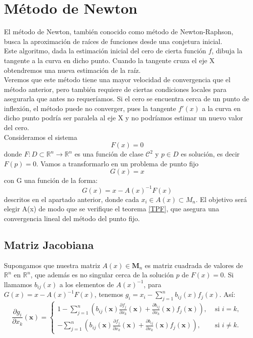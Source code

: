 \section{Método de Newton}

El método de Newton, también conocido como método de Newton-Raphson, busca la aproximación de raíces de funciones desde una conjetura inicial. \\
Este algoritmo, dada la estimación inicial del cero de cierta función $f$, dibuja la tangente a la curva en dicho punto. Cuando la tangente cruza el eje X obtendremos una nueva estimación de la raíz.\\
Veremos que este método tiene una mayor velocidad de convergencia que el método anterior, pero también requiere de ciertas condiciones locales para asegurarla que antes no requeríamos. Si el cero se encuentra cerca de un punto de inflexión, el método puede no converger, pues la tangente $f'(x)$ a la curva en dicho punto podría ser paralela al eje X y no podríamos estimar un nuevo valor del cero.\\

Consideramos el sistema $$F(x)=0$$ donde $F: D \subset \mathbb{R}^{n} \longrightarrow \mathbb{R}^n$ es una función de clase $\mathcal{C}^{2}$ y $p \in D$ es solución, es decir $F(p) = 0$.
Vamos a transformarlo en un problema de punto fijo $$G(x) = x$$ con G una función de la forma:
\[G(x) = x - A(x)^{-1} F(x)\]
descritos en el apartado anterior, donde cada $x_{i} \in A(x) \subset M_{n}$. El objetivo será elegir A(x) de modo que se verifique el teorema \ref{TPF}, que asegura una convergencia lineal del método del punto fijo.\\

\subsection{Matriz Jacobiana}

Supongamos que nuestra matriz $A(x) \in \mathbf{M}_n$ es matriz cuadrada de valores de $\mathbb{R}^n$ en $\mathbb{R}^n$, que además es no singular cerca de la solución $p$ de $F(x) = 0$. Si llamamos $b_{ij}(x)$ a los elementos de $A(x)^{-1}$, para $G(x) = x - A(x)^{-1}F(x)$, tenemos $g_i = x_i - \sum_{j=1}^{n} b_{ij}(x)f_j(x)$. Así:
\[\frac{\partial g_{i}}{\partial x_{k}}(\mathbf{x})=\left\{\begin{array}{ll}
	1-\sum_{j=1}^{n}\left(b_{i j}(\mathbf{x}) \frac{\partial f_{j}}{\partial x_{k}}(\mathbf{x})+\frac{\partial b_{i j}}{\partial x_{k}}(\mathbf{x}) f_{j}(\mathbf{x})\right), & \text { si } i=k ,\\
	-\sum_{j=1}^{n}\left(b_{i j}(\mathbf{x}) \frac{\partial f_{j}}{\partial x_{k}}(\mathbf{x})+\frac{\partial b_{i j}}{\partial x_{k}}(\mathbf{x}) f_{j}(\mathbf{x})\right), & \text { si } i \neq k .
\end{array}\right.\]

